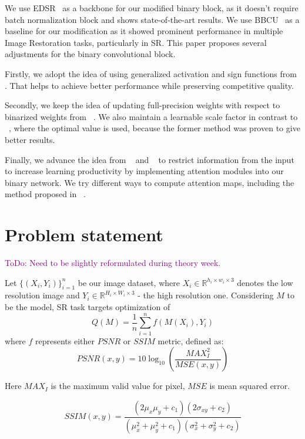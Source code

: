 \documentclass{article}
\newcommand{\TODO}[1]{\textcolor{purple}{ToDo: #1.}}
\begin{document}
We use EDSR~\cite{lim2017enhanced} as a backbone for our modified binary block, as it doesn't require batch normalization block and shows state-of-the-art results. We use BBCU~\cite{xia2022basic} as a baseline for our modification as it showed prominent performance in multiple Image Restoration tasks, particularly in SR. This paper proposes several adjustments for the binary convolutional block.

Firstly, we adopt the idea of using generalized activation and sign functions from \cite{liu2020reactnet}. That helps to achieve better performance while preserving competitive quality. 

Secondly, we keep the idea of updating full-precision weights with respect to binarized weights from ~\cite{ma2019efficient}. We also maintain a learnable scale factor in contrast to ~\cite{xia2022basic}, where the optimal value is used, because the former method was proven to give better results.

Finally, we advance the idea from ~\cite{xue2022ir2net} and ~\cite{guo2022join} to restrict information from the input to increase learning productivity by implementing attention modules into our binary network. We try different ways to compute attention maps, including the method proposed in ~\cite{zhao2020efficient}.

\section{Problem statement}
\label{sec:headings}

\TODO{Need to be slightly reformulated during theory week}

Let $\{(X_i, Y_i)\}_{i=1}^n$ be our image dataset, where $X_i \in \mathbb{R}^{h_i \times w_i \times 3}$ denotes the low resolution image and $Y_i \in \mathbb{R}^{H_i \times W_i \times 3}$ - the high resolution one. Considering $M$ to be the model, SR task targets optimization of 
\begin{equation}
    Q(M) = \frac{1}{n}\sum\limits_{i=1}^nf(M(X_i), Y_i)
\end{equation}
where $f$ represents either $PSNR$ or $SSIM$ metric, defined as:
\begin{equation}
    PSNR(x, y) = 10 \log_{10} \left(\frac{MAX_I^2}{MSE(x, y)}\right)
\end{equation}


Here $MAX_I$ is the maximum valid value for pixel, $MSE$ is mean squared error.

\begin{equation}
    SSIM(x, y) = \frac{(2\mu_x\mu_y + c_1)(2\sigma_{xy} + c_2)}{(\mu_x^2 + \mu_y^2 + c_1)(\sigma_{x}^2 + \sigma_{y}^2 + c_2)}
\end{equation}
\end{document}
